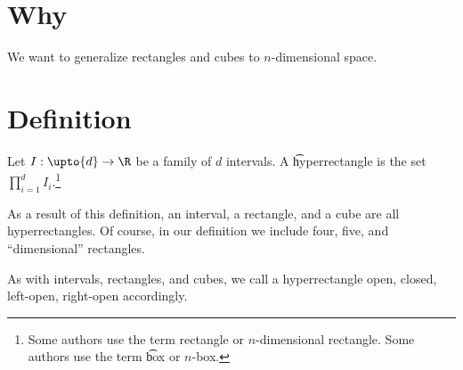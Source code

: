 
\section*{Why}

We want to generalize rectangles and cubes to $n$-dimensional space.

\section*{Definition}

Let $I: \upto{d} \to \R $ be a family of $d$ intervals.
A \t{hyperrectangle} is the set $\prod_{i=1}^{d} I_i$.\footnote{Some authors use the term rectangle or \t{$n$-dimensional rectangle}.
Some authors use the term \t{box} or \t{$n$-box}.}

As a result of this definition, an interval, a rectangle, and a cube are all hyperrectangles.
Of course, in our definition we include four, five, and ``dimensional'' rectangles.

As with intervals, rectangles, and cubes, we call a hyperrectangle open, closed, left-open, right-open accordingly.

\blankpage